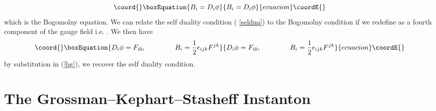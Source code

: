 \documentclass[a4paper,12pt]{book}
\begin{document}
\begin{equation}\coord{}\boxEquation{
B_{i}=D_{i}\phi  \label{bg}
}{
B_{i}=D_{i}\phi  }{ecuacion}\coordE{}\end{equation}
which is the Bogomolny equation. We can relate the self duality condition (%
\ref{seldua}) to the Bogomolny condition if we redefine \myHighlight{$\phi $}\coordHE{} as a fourth
component \coordHE{} of the gauge field \coordHE{} i.e. \coordHE{}. We then have 
\begin{equation}\coord{}\boxEquation{
D_{i}\phi =F_{i0},\;\;\;\;\;\;\;\;\;\;\;\;\;\;\;B_{i}=\frac{1}{2}\epsilon
_{ijk}F^{jk}
}{
D_{i}\phi =F_{i0},\;\;\;\;\;\;\;\;\;\;\;\;\;\;\;B_{i}=\frac{1}{2}\epsilon
_{ijk}F^{jk}
}{ecuacion}\coordE{}\end{equation}
by substitution in (\ref{bg}), we recover the self duality condition.

\section{The Grossman--Kephart--Stasheff Instanton}
\end{document}
